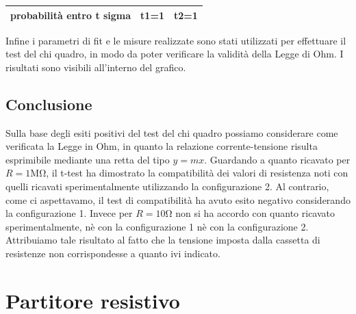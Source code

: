 \documentclass[a4paper]{article}
\begin{document}
\begin{center}
\begin{tabular}{|l|c|c|}
\hline
probabilità entro t sigma & t1=1 & t2=1 \\
\hline
\end{tabular}
\end{center}

Infine i parametri di fit e le misure realizzate sono stati utilizzati per effettuare il test del chi quadro, in modo da poter verificare la validità della Legge di Ohm. I risultati sono visibili all'interno del grafico.


\subsection{Conclusione}
Sulla base degli esiti positivi del test del chi quadro possiamo considerare come verificata la Legge in Ohm, in quanto la relazione corrente-tensione risulta esprimibile mediante una retta del tipo \(y= mx\).
Guardando a quanto ricavato per \(R=1\si{\mega\ohm}\), il t-test ha dimostrato la compatibilità dei valori di resistenza noti con quelli ricavati sperimentalmente utilizzando la configurazione 2. Al contrario, come ci aspettavamo, il test di compatibilità ha avuto esito negativo considerando la configurazione 1. Invece per \(R = 10\si{\ohm}\) non si ha accordo con quanto ricavato sperimentalmente, nè con la configurazione 1 nè con la configurazione 2. Attribuiamo tale risultato al fatto che la tensione imposta dalla cassetta di resistenze non corrispondesse a quanto ivi indicato.


\section{Partitore resistivo}
\end{document}
